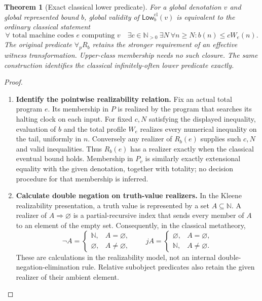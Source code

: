 \documentclass[11pt,a4paper]{article}
\numberwithin{algorithm}{section}
\numberwithin{equation}{section}
\newtheorem{theorem}{Theorem}[section]
\theoremstyle{definition}
\theoremstyle{remark}
\theoremstyle{plain}
\newcommand{\N}{\mathbb N}
\theoremstyle{definition}
\theoremstyle{plain}
\begin{document}
\begin{theorem}[Exact classical lower predicate]
\label{thm:wc-classical-lower}
For a global denotation $v$ and global represented bound $b$, global
validity of $\mathsf{Low}^{\mathrm{cl}}_b(v)$ is equivalent to the
ordinary classical statement
\[
 \forall\text{ total machine codes }e\text{ computing }v\quad
 \exists c\in\N_{>0}\ \exists N\ \forall n\ge N:
 b(n)\le cW_e(n).
\]
The original predicate $\forall_pR_b$ retains the stronger requirement
of an effective witness transformation. Upper-class membership needs
no such closure. The same construction identifies the classical
infinitely-often lower predicate exactly.
\end{theorem}
\begin{proof}\leavevmode
\begin{enumerate}[leftmargin=*,align=left]
\item \textbf{Identify the pointwise realizability relation.}
Fix an actual total program $e$. Its membership in $P$ is realized by
the program that searches its halting clock on each input. For fixed
$c,N$ satisfying the displayed inequality, evaluation of $b$ and the
total profile $W_e$ realizes every numerical inequality on the tail,
uniformly in $n$. Conversely any realizer of $R_b(e)$ supplies such
$c,N$ and valid inequalities. Thus $R_b(e)$ has a realizer exactly
when the classical eventual bound holds. Membership in $P_v$ is
similarly exactly extensional equality with the given denotation,
together with totality; no decision procedure for that membership
is inferred.
\item \textbf{Calculate double negation on truth-value realizers.}
In the Kleene realizability presentation, a truth value is represented
by a set $A\subseteq\N$. A realizer of $A\Rightarrow\varnothing$
is a partial-recursive index that sends every member of $A$ to an
element of the empty set. Consequently, in the classical metatheory,
\[
 \neg A=\begin{cases}\N,&A=\varnothing,\\
                         \varnothing,&A\ne\varnothing,
         \end{cases}
 \qquad
 jA=\begin{cases}\varnothing,&A=\varnothing,\\
                         \N,&A\ne\varnothing.
         \end{cases}
\]
These are calculations in the realizability model, not an internal
double-negation-elimination rule. Relative subobject predicates also
retain the given realizer of their ambient element.

\end{enumerate}
\end{proof}
\end{document}
